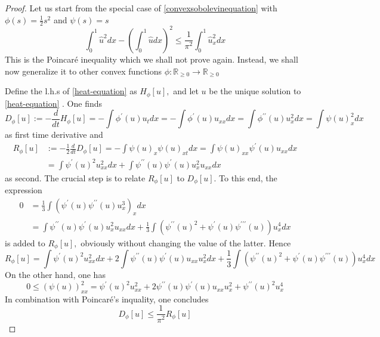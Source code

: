 \begin{proof}
	Let us start from the special case of \eqref{convexsobolevinequation} with $\phi(s)=\frac{1}{2} s^{2}$ and $\psi(s)=s$
	$$
	\int_{0}^{1} \hat{u}^{2} d x-\left(\int_{0}^{1} \hat{u} d x\right)^{2} \leq \frac{1}{\pi^{2}} \int_{0}^{1} \hat{u}_{x}^{2} d x
	$$
	This is the Poincaré inequality which we shall not prove again. Instead, we shall now generalize it to other convex functions $\phi: \mathbb{R}_{\geq 0} \rightarrow \mathbb{R}_{\geq 0}$
	
	Define the l.h.s of \eqref{heat-equation} as $H_{\phi}[u],$ and let $u$ be the unique solution to \eqref{heat-equation} . One finds
	$$
	D_{\phi}[u]:=-\frac{d}{d t} H_{\phi}[u]=-\int \phi^{\prime}(u) u_{t} d x=-\int \phi^{\prime}(u) u_{x x} d x=\int \phi^{\prime \prime}(u) u_{x}^{2} d x=\int \psi(u)_{x}^{2} d x
	$$
	as first time derivative and
	$$
	\begin{aligned}
		R_{\phi}[u] &:=-\frac{1}{2} \frac{d}{d t} D_{\phi}[u]=-\int \psi(u)_{x} \psi(u)_{x t} d x=\int \psi(u)_{x x} \psi^{\prime}(u) u_{x x} d x \\
		&=\int \psi^{\prime}(u)^{2} u_{x x}^{2} d x+\int \psi^{\prime \prime}(u) \psi^{\prime}(u) u_{x}^{2} u_{x x} d x
	\end{aligned}
	$$
	as second. The crucial step is to relate $R_{\phi}[u]$ to $D_{\phi}[u] .$ To this end, the expression
	$$
	\begin{aligned}
		0 &=\frac{1}{3} \int\left(\psi^{\prime}(u) \psi^{\prime \prime}(u) u_{x}^{3}\right)_{x} d x \\
		&=\int \psi^{\prime \prime}(u) \psi^{\prime}(u) u_{x}^{2} u_{x x} d x+\frac{1}{3} \int\left(\psi^{\prime \prime}(u)^{2}+\psi^{\prime}(u) \psi^{\prime \prime \prime}(u)\right) u_{x}^{4} d x
	\end{aligned}
	$$
	is added to $R_{\phi}[u],$ obviously without changing the value of the latter. Hence
	$$
	R_{\phi}[u]=\int \psi^{\prime}(u)^{2} u_{x x}^{2} d x+2 \int \psi^{\prime \prime}(u) \psi^{\prime}(u) u_{x x} u_{x}^{2} d x+\frac{1}{3} \int\left(\psi^{\prime \prime}(u)^{2}+\psi^{\prime}(u) \psi^{\prime \prime \prime}(u)\right) u_{x}^{4} d x
	$$
	On the other hand, one has
	$$
	0 \leq(\psi(u))_{x x}^{2}=\psi^{\prime}(u)^{2} u_{x x}^{2}+2 \psi^{\prime \prime}(u) \psi^{\prime}(u) u_{x x} u_{x}^{2}+\psi^{\prime \prime}(u)^{2} u_{x}^{4}
	$$
	In combination with Poincaré's inquality, one concludes
	\begin{equation}\label{entropy-production-prime-entropy-production-inequation}
	D_{\phi}[u] \leq \frac{1}{\pi^{2}} R_{\phi}[u]

\end{equation}
\end{proof}
